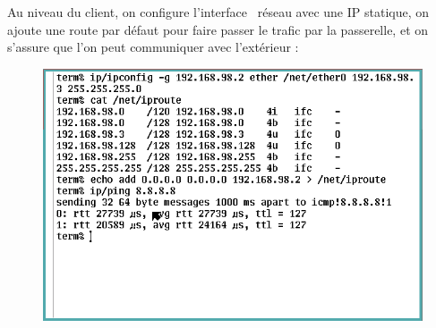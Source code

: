 \documentclass[a4paper]{article}
\begin{document}
Au niveau du client, on configure l'\og interface \fg\ réseau
avec une IP statique, on ajoute une route par défaut pour faire
passer le trafic par la passerelle, et on s'assure que l'on peut
communiquer avec l'extérieur :
\begin{figure}[!ht]
	\centering
	\includegraphics[scale=.5]{ipconfig.png}
\end{figure}
\end{document}
